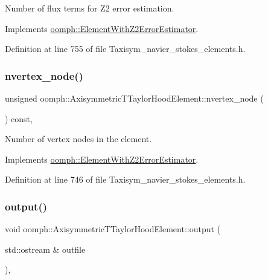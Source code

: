 Number of \textquotesingle{}flux\textquotesingle{} terms for Z2 error estimation. 



Implements \hyperlink{classoomph_1_1ElementWithZ2ErrorEstimator_ae82c5728902e13da31be19c390fc28e3}{oomph\+::\+Element\+With\+Z2\+Error\+Estimator}.



Definition at line 755 of file Taxisym\+\_\+navier\+\_\+stokes\+\_\+elements.\+h.

\mbox{\label{classoomph_1_1AxisymmetricTTaylorHoodElement_a2a8cccdcdfd71e3c5f4c4ce07189442c}} 
\subsubsection{\texorpdfstring{nvertex\+\_\+node()}{nvertex\_node()}}
{\footnotesize\ttfamily unsigned oomph\+::\+Axisymmetric\+T\+Taylor\+Hood\+Element\+::nvertex\+\_\+node (\begin{DoxyParamCaption}{ }\end{DoxyParamCaption}) const\hspace{0.3cm}{\ttfamily [inline]}, {\ttfamily [virtual]}}



Number of vertex nodes in the element. 



Implements \hyperlink{classoomph_1_1ElementWithZ2ErrorEstimator_a19495a0e77ef4ff35f15fdf7913b4077}{oomph\+::\+Element\+With\+Z2\+Error\+Estimator}.



Definition at line 746 of file Taxisym\+\_\+navier\+\_\+stokes\+\_\+elements.\+h.

\mbox{\label{classoomph_1_1AxisymmetricTTaylorHoodElement_a538cd24096fa521e0dac0f1f78ce5446}} 
\subsubsection{\texorpdfstring{output()}{output()}\hspace{0.1cm}{\footnotesize\ttfamily [1/4]}}
{\footnotesize\ttfamily void oomph\+::\+Axisymmetric\+T\+Taylor\+Hood\+Element\+::output (\begin{DoxyParamCaption}\item[{std\+::ostream \&}]{outfile }\end{DoxyParamCaption})\hspace{0.3cm}{\ttfamily [inline]}, {\ttfamily [virtual]}}



